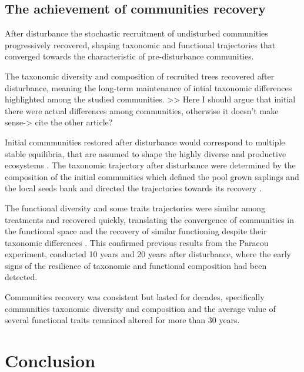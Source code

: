 \documentclass[fleqn,10pt]{ArtEcoFoG} %
\begin{document}
\subsection{The achievement of communities
recovery}\label{the-achievement-of-communities-recovery}

After disturbance the stochastic recruitment of undisturbed communities
progressively recovered, shaping taxonomic and functional trajectories
that converged towards the characteristic of pre-disturbance
communities.

The taxonomic diversity and composition of recruited trees recovered
after disturbance, meaning the long-term maintenance of intial taxonomic
differences highlighted among the studied communities.
\textgreater{}\textgreater{} Here I should argue that initial there were
actual differences among communities, otherwise it doesn't make
sense-\textgreater{} cite the other article?

Initial commmunities restored after disturbance would correspond to
multiple stable equilibria, that are assumed to shape the highly diverse
and productive ecosystems \citep{Chase2003}. The taxonomic trajectory
after disturbance were determined by the composition of the initial
communities which defined the pool grown saplings and the local seeds
bank and directed the trajectories towards its recovery
\citep{Dalling2002, Anderson2007}.

The functional diversity and some traits trajectories were similar among
treatments and recovered quickly, translating the convergence of
communities in the functional space and the recovery of similar
functioning despite their taxonomic differences \citep{Fukami2005}. This
confirmed previous results from the Paracou experiment, conducted 10
years \citep{Molino2001} and 20 years \citep{Baraloto2012a} after
disturbance, where the early signs of the resilience of taxonomic and
functional composition had been detected.

Communities recovery was consistent but lasted for decades, specifically
communities taxonomic diversity and composition and the average value of
several functional traits remained altered for more than 30 years.

\section{Conclusion}\label{conclusion}
\end{document}
